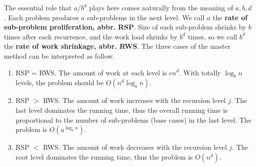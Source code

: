 The essential role that $a/b^d$ plays here comes naturally from the meaning of $a,b,d$. Each problem produces $a$ sub-problems in the next level. We call $a$ the \textbf{rate of sub-problem proliferation, abbr. RSP}. Size of each sub-problem shrinks by $b$ times after each recurrence, and the work load shrinks by $b^d$ times, so we call $b^d$ the \textbf{rate of work shrinkage, abbr. RWS}. The three cases of the master method can be interpreted as follow.
\begin{enumerate}
\item RSP = RWS. The amount of work at each level is $cn^d$. With totally $\log_bn$ levels, the problem should be $O(n^d\log_bn)$.
\item RSP $>$ RWS. The amount of work increases with the recursion level $j$. The last level dominates the running time, thus the overall running time is proportional to the number of sub-problems (base cases) in the last level. The problem is $O(a^{\log_bn})$.
\item RSP $<$ RWS. The amount of work decreases with the recursion level $j$. The root level dominates the running time, thus the problem is $O(n^d)$. 
\end{enumerate}
\ifx\PREAMBLE\undefined

\fi